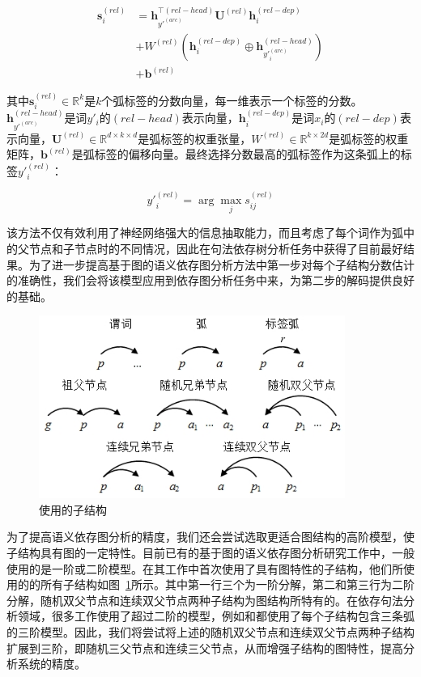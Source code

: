 \begin{equation}
\begin{split}
\mathbf{s}^{(rel)}_i & = \mathbf{h}_{y'^{(arc)}}^{\top(rel-head)}\mathbf{U}^{(rel)}\mathbf{h}^{(rel-dep)}_i \\
& + W^{(rel)}(\mathbf{h}^{(rel-dep)}_i \oplus \mathbf{h}^{(rel-head)}_{y'^{(arc)}_i}) \\
& + \mathbf{b}^{(rel)}
\end{split}
\end{equation}

其中$\mathbf{s}^{(rel)}_i \in \mathbb{R}^{k}$是$k$个弧标签的分数向量，每一维表示一个标签的分数。$\mathbf{h}_{y'^{(arc)}}^{(rel-head)}$是词$y'_i$的$(rel-head)$表示向量，$\mathbf{h}^{(rel-dep)}_i$是词$x_i$的$(rel-dep)$表示向量，$\mathbf{U}^{(rel)} \in \mathbb{R}^{d\times k \times d}$是弧标签的权重张量，$W^{(rel)} \in \mathbb{R}^{k \times 2d}$是弧标签的权重矩阵，$\mathbf{b}^{(rel)}$是弧标签的偏移向量。最终选择分数最高的弧标签作为这条弧上的标签$y'^{(rel)}_i$：

\begin{equation}
y'^{(rel)}_i = \arg \max_j s^{(rel)}_{ij}
\end{equation}

该方法不仅有效利用了神经网络强大的信息抽取能力，而且考虑了每个词作为弧中的父节点和子节点时的不同情况，因此在句法依存树分析任务中获得了目前最好结果。为了进一步提高基于图的语义依存图分析方法中第一步对每个子结构分数估计的准确性，我们会将该模型应用到依存图分析任务中来，为第二步的解码提供良好的基础。

\begin{figure}[hbtp]
	\centering
	\includegraphics[width=100mm]{picture/parts.jpg}
	\caption{使用的子结构}
	\label{fig:parts}
\end{figure}

为了提高语义依存图分析的精度，我们还会尝试选取更适合图结构的高阶模型，使子结构具有图的一定特性。目前已有的基于图的语义依存图分析研究工作中，一般使用的是一阶或二阶模型。在其工作中首次使用了具有图特性的子结构，他们所使用的的所有子结构如图~\ref{fig:parts}所示。其中第一行三个为一阶分解，第二和第三行为二阶分解，随机双父节点和连续双父节点两种子结构为图结构所特有的。在依存句法分析领域，很多工作使用了超过二阶的模型，例如和都使用了每个子结构包含三条弧的三阶模型。因此，我们将尝试将上述的随机双父节点和连续双父节点两种子结构扩展到三阶，即随机三父节点和连续三父节点，从而增强子结构的图特性，提高分析系统的精度。

